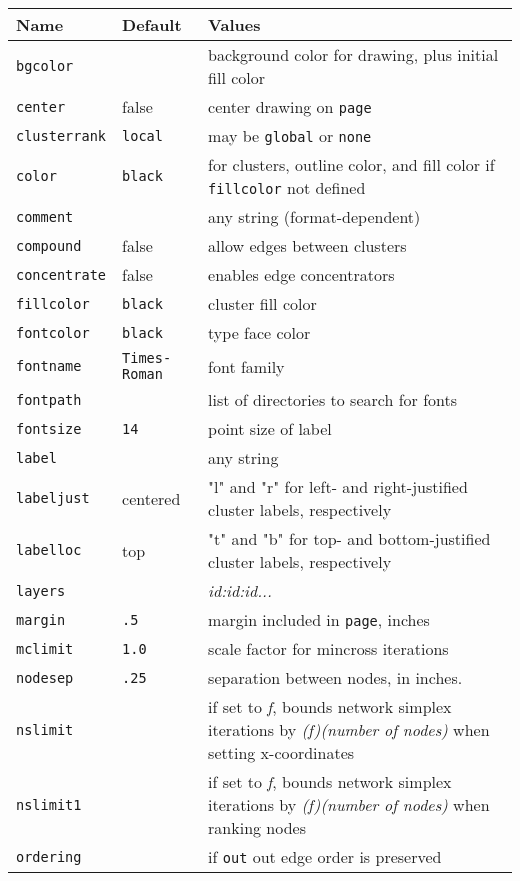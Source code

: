 \documentclass[11pt]{article}
\begin{document}
\begin{table}[p]\footnotesize
\begin{tabular}[t]{|l|l|p{3.5in}|} \hline
Name & Default & Values \\ \hline
{\tt bgcolor} &  & background color for drawing, plus initial fill color \\
{\tt center} & false & center drawing on {\tt page} \\ 
{\tt clusterrank} & {\tt local} & may be {\tt global} or {\tt none} \\
{\tt color} & {\tt black} & for clusters, outline color, and fill color
if {\tt fillcolor} not defined \\
{\tt comment} & & any string (format-dependent) \\
{\tt compound} & false & allow edges between clusters \\
{\tt concentrate} & false & enables edge concentrators  \\ 
{\tt fillcolor} & {\tt black} & cluster fill color \\
{\tt fontcolor} & {\tt black} & type face color \\ 
{\tt fontname} & {\tt Times-Roman} & font family \\
{\tt fontpath} &  & list of directories to search for fonts \\
{\tt fontsize} & {\tt 14} & point size of label \\
{\tt label} & & any string \\
{\tt labeljust} & centered & "l" and "r" for left- and right-justified 
cluster labels, respectively \\
{\tt labelloc} & top & "t" and "b" for top- and bottom-justified cluster 
labels, respectively \\
{\tt layers} & & {\it id:id:id...} \\
{\tt margin} & {\tt .5} & margin included in {\tt page}, inches \\
{\tt mclimit} & {\tt 1.0} & scale factor for mincross iterations \\
{\tt nodesep} & {\tt .25} & separation between nodes, in inches. \\
{\tt nslimit} & & if set to {\it f}, bounds network simplex iterations by {\it (f)(number of nodes)} when setting x-coordinates \\ 
{\tt nslimit1} & & if set to {\it f}, bounds network simplex iterations by {\it (f)(number of nodes)} when ranking nodes \\ 
{\tt ordering} & & if {\tt out} out edge order is preserved \\

\end{tabular}
\end{table}
\end{document}
